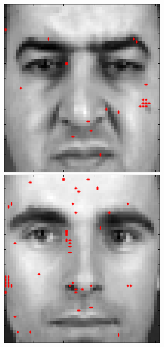 \begin{figure}[ht]
 \includegraphics[width=\textwidth*11/100]{ch5/figures/XM2VTS_4_-1.png}
 \includegraphics[width=\textwidth*11/100]{ch5/figures/XM2VTS_5_-1.png}

\end{figure}
